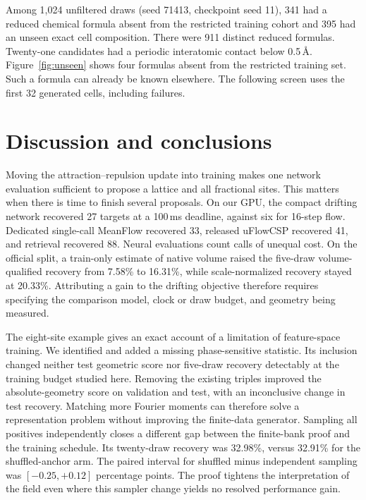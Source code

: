 \documentclass[10pt]{article}
\begin{document}
Among 1,024 unfiltered draws (seed 71413, checkpoint seed 11), 341 had a reduced chemical formula absent from the restricted training cohort and 395 had an unseen exact cell composition. There were 911 distinct reduced formulas. Twenty-one candidates had a periodic interatomic contact below 0.5\,\AA. Figure~\ref{fig:unseen} shows four formulas absent from the restricted training set. Such a formula can already be known elsewhere. The following screen uses the first 32 generated cells, including failures.





\section{Discussion and conclusions}
Moving the attraction--repulsion update into training makes one network evaluation sufficient to propose a lattice and all fractional sites. This matters when there is time to finish several proposals. On our GPU, the compact drifting network recovered 27 targets at a 100\,ms deadline, against six for 16-step flow. Dedicated single-call MeanFlow recovered 33, released uFlowCSP recovered 41, and retrieval recovered 88. Neural evaluations count calls of unequal cost. On the official split, a train-only estimate of native volume raised the five-draw volume-qualified recovery from 7.58\% to 16.31\%, while scale-normalized recovery stayed at 20.33\%. Attributing a gain to the drifting objective therefore requires specifying the comparison model, clock or draw budget, and geometry being measured.

The eight-site example gives an exact account of a limitation of feature-space training. We identified and added a missing phase-sensitive statistic. Its inclusion changed neither test geometric score nor five-draw recovery detectably at the training budget studied here. Removing the existing triples improved the absolute-geometry score on validation and test, with an inconclusive change in test recovery. Matching more Fourier moments can therefore solve a representation problem without improving the finite-data generator. Sampling all positives independently closes a different gap between the finite-bank proof and the training schedule. Its twenty-draw recovery was 32.98\%, versus 32.91\% for the shuffled-anchor arm. The paired interval for shuffled minus independent sampling was $[-0.25,+0.12]$ percentage points. The proof tightens the interpretation of the field even where this sampler change yields no resolved performance gain.
\end{document}
